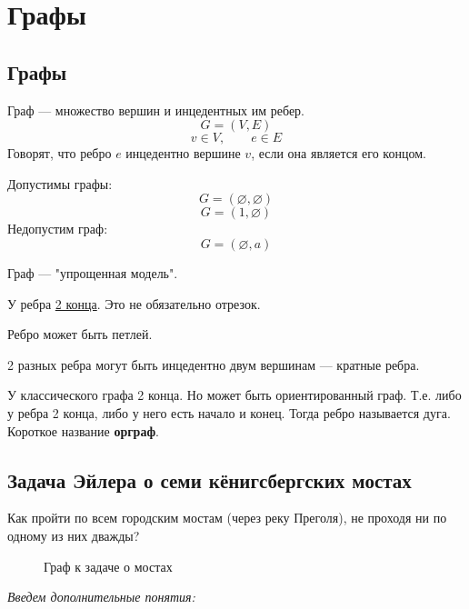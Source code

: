 \chapter{Графы}
\section{Графы}
Граф --- множество вершин и инцедентных им ребер.
$$G=(V, E)$$
$$v \in V, \qquad e \in E $$
Говорят, что ребро $e$ инцедентно вершине $v$, если она является его концом.

Допустимы графы:
$$G = (\varnothing, \varnothing)$$
$$G = ({1}, \varnothing)$$
Недопустим граф:
$$G = (\varnothing, {a})$$

Граф --- "упрощенная модель".

У ребра \underline{2 конца}. Это не обязательно отрезок. 

Ребро может быть петлей.

2 разных ребра могут быть инцедентно двум вершинам --- кратные ребра.

У классического графа 2 конца. Но может быть ориентированный граф. Т.е. либо у ребра 2 конца, либо у него есть начало и конец. Тогда ребро называется дуга. Короткое название \textbf{орграф}.

\section{Задача Эйлера о семи кёнигсбергских мостах}
Как пройти по всем городским мостам (через реку Преголя), не проходя ни по одному из них дважды?
\begin{figure}[h!]
	\noindent{}
	\caption{Граф к задаче о мостах}
	\label{fp_2}
	\vspace{-0.5cm}
\end{figure}

\textit{Введем дополнительные понятия:}

